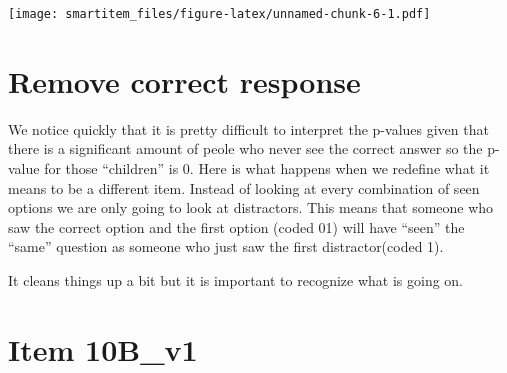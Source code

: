 \documentclass[]{book}
\newenvironment{Shaded}{\begin{snugshade}}{\end{snugshade}}
\newcommand{\KeywordTok}[1]{\textcolor[rgb]{0.13,0.29,0.53}{\textbf{#1}}}
\newcommand{\DataTypeTok}[1]{\textcolor[rgb]{0.13,0.29,0.53}{#1}}
\newcommand{\StringTok}[1]{\textcolor[rgb]{0.31,0.60,0.02}{#1}}
\newcommand{\OperatorTok}[1]{\textcolor[rgb]{0.81,0.36,0.00}{\textbf{#1}}}
\newcommand{\NormalTok}[1]{#1}
\theoremstyle{definition}
\theoremstyle{definition}
\theoremstyle{definition}
\theoremstyle{remark}
\begin{document}
\texttt{[image: smartitem\_files/figure-latex/unnamed-chunk-6-1.pdf]}

\section{Remove correct response}\label{remove-correct-response}

We notice quickly that it is pretty difficult to interpret the p-values
given that there is a significant amount of peole who never see the
correct answer so the p-value for those ``children'' is 0. Here is what
happens when we redefine what it means to be a different item. Instead
of looking at every combination of seen options we are only going to
look at distractors. This means that someone who saw the correct option
and the first option (coded 01) will have ``seen'' the ``same'' question
as someone who just saw the first distractor(coded 1).

It cleans things up a bit but it is important to recognize what is going
on.

\begin{Shaded}
\end{Shaded}

\section{Item 10B\_v1}\label{item-10b_v1-1}

\begin{Shaded}
\end{Shaded}
\end{document}
